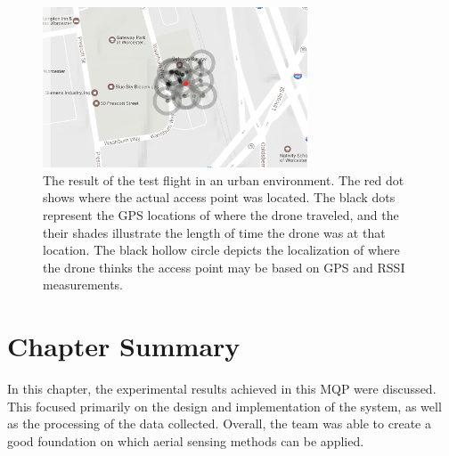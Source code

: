 \begin{figure}[ht!]
    \centering
    \includegraphics[width=0.70\textwidth]{img/urban_test_map.png}
    \caption{The result of the test flight in an urban environment. The red dot shows where the actual access point was located. The black dots represent the GPS locations of where the drone traveled, and the their shades illustrate the length of time the drone was at that location. The black hollow circle depicts the localization of where the drone thinks the access point may be based on GPS and RSSI measurements.}
    \label{fig:urban_test}
\end{figure} \par



\section{Chapter Summary}
In this chapter, the experimental results achieved in this MQP were discussed. This focused primarily on the design and implementation of the system, as well as the processing of the data collected. Overall, the team was able to create a good foundation on which aerial sensing methods can be applied.
